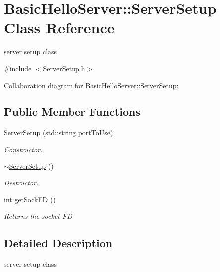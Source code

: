 \hypertarget{classBasicHelloServer_1_1ServerSetup}{}\section{Basic\+Hello\+Server\+::Server\+Setup Class Reference}
\label{classBasicHelloServer_1_1ServerSetup}


server setup class  




{\ttfamily \#include $<$Server\+Setup.\+h$>$}



Collaboration diagram for Basic\+Hello\+Server\+::Server\+Setup\+:
\subsection*{Public Member Functions}
\begin{DoxyCompactItemize}
\item 
\mbox{\hyperlink{classBasicHelloServer_1_1ServerSetup_ad2ef8a2e76a778fd7197efbbf6a38166}{Server\+Setup}} (std\+::string port\+To\+Use)
\begin{DoxyCompactList}\small\item\em Constructor. \end{DoxyCompactList}\item 
\mbox{\label{classBasicHelloServer_1_1ServerSetup_aeb6e4108e18a0be4bc72d047afbb5483}} 
\mbox{\hyperlink{classBasicHelloServer_1_1ServerSetup_aeb6e4108e18a0be4bc72d047afbb5483}{$\sim$\+Server\+Setup}} ()
\begin{DoxyCompactList}\small\item\em Destructor. \end{DoxyCompactList}\item 
int \mbox{\hyperlink{classBasicHelloServer_1_1ServerSetup_a61edf15413b9cb6332ca08e92a4c561d}{get\+Sock\+FD}} ()
\begin{DoxyCompactList}\small\item\em Returns the socket FD. \end{DoxyCompactList}\end{DoxyCompactItemize}


\subsection{Detailed Description}
server setup class 

